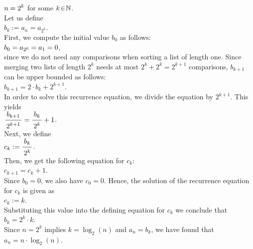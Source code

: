 \hspace*{1.3cm}
$\displaystyle n = 2^k$ \qquad for some $k \!\in\! \mathbb{N}$.
\\[0.2cm]
Let us define
\\[0.2cm]
\hspace*{1.3cm}
$b_k := a_n = a_{2^k}$.
\\[0.2cm]
First, we compute the initial value $b_0$ as follows:
\\[0.2cm]
\hspace*{1.3cm}
$\displaystyle b_0 = a_{2^0} = a_1 = 0$,
\\[0.2cm]
since we do not need any comparisons when sorting a list of length one.  Since merging two lists of
length $2^k$ needs at most  $2^k + 2^k = 2^{k+1}$ comparisons, $b_{k+1}$ can be upper bounded as follows:
\\[0.2cm]
\hspace*{1.3cm}
$b_{k+1} = 2 \cdot b_k + 2^{k+1}$. 
\\[0.2cm]
In order to solve this recurrence equation, we divide the equation by $2^{k+1}$.
This yields
\\[0.2cm]
\hspace*{1.3cm}
$\bruch{b_{k+1}}{2^{k+1}} = \bruch{b_k}{2^k} + 1$.
\\[0.2cm]
Next, we define
\\[0.2cm]
\hspace*{1.3cm}
$c_k := \bruch{b_k}{2^k}$.
\\[0.2cm]
Then, we get the following equation for $c_k$:
\\[0.2cm]
\hspace*{1.3cm}
$c_{k+1} = c_k + 1$.
\\[0.2cm]
Since $b_0 = 0$, we also have $c_0 = 0$.  Hence, the solution of the recurrence equation for $c_k$
is given as
\\[0.2cm]
\hspace*{1.3cm}
$c_k := k$.
\\[0.2cm]
Substituting this value into the defining equation for $c_k$ we conclude that
\\[0.2cm]
\hspace*{1.3cm}
$b_k = 2^k \cdot k$.
\\[0.2cm]
Since $n = 2^k$ implies $k = \log_2(n)$ and $a_n = b_k$, we have found that
\\[0.2cm]
\hspace*{1.3cm}
$a_n = n \cdot \log_2(n)$. 



